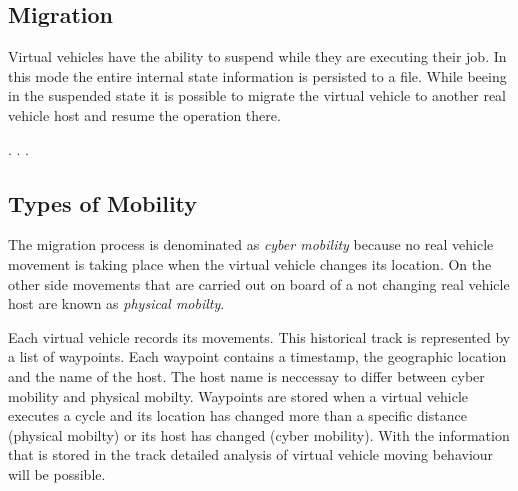 \subsection{Migration}

Virtual vehicles have the ability to suspend while they are executing their job. In this mode the entire internal state information is persisted to a file. While beeing in the suspended state it is possible to migrate the virtual vehicle to another real vehicle host and resume the operation there. 

. . .

% 


\subsection{Types of Mobility}
The migration process is denominated as \emph{cyber mobility} because no real vehicle movement is taking place when the virtual vehicle changes its location. On the other side movements that are carried out on board of a not changing real vehicle host are known as \emph{physical mobilty}.

Each virtual vehicle records its movements. This historical track is represented by a list of waypoints. Each waypoint contains a timestamp, the geographic location and the name of the host. The host name is neccessay to differ between cyber mobility and physical mobilty. Waypoints are stored when a virtual vehicle executes a cycle and its location has changed more than a specific distance (physical mobilty) or its host has changed (cyber mobility). With the information that is stored in the track detailed analysis of virtual vehicle moving behaviour will be possible.



